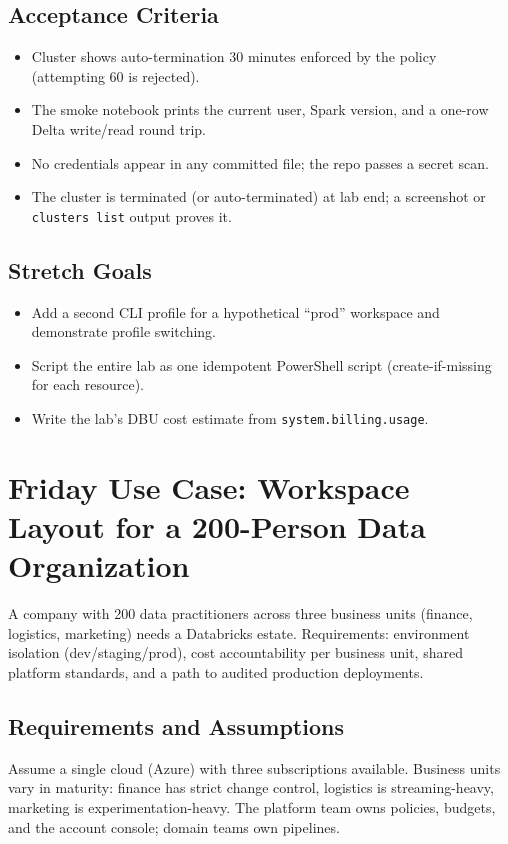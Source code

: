 \subsection*{Acceptance Criteria}
\begin{itemize}
    \item Cluster shows auto-termination 30 minutes enforced by the policy (attempting 60 is rejected).
    \item The smoke notebook prints the current user, Spark version, and a one-row Delta write/read round trip.
    \item No credentials appear in any committed file; the repo passes a secret scan.
    \item The cluster is terminated (or auto-terminated) at lab end; a screenshot or \texttt{clusters list} output proves it.
\end{itemize}

\subsection*{Stretch Goals}
\begin{itemize}
    \item Add a second CLI profile for a hypothetical ``prod'' workspace and demonstrate profile switching.
    \item Script the entire lab as one idempotent PowerShell script (create-if-missing for each resource).
    \item Write the lab's DBU cost estimate from \texttt{system.billing.usage}.
\end{itemize}

\section{Friday Use Case: Workspace Layout for a 200-Person Data Organization}
A company with 200 data practitioners across three business units (finance, logistics, marketing) needs a Databricks estate. Requirements: environment isolation (dev/staging/prod), cost accountability per business unit, shared platform standards, and a path to audited production deployments.

\subsection{Requirements and Assumptions}
Assume a single cloud (Azure) with three subscriptions available. Business units vary in maturity: finance has strict change control, logistics is streaming-heavy, marketing is experimentation-heavy. The platform team owns policies, budgets, and the account console; domain teams own pipelines.

